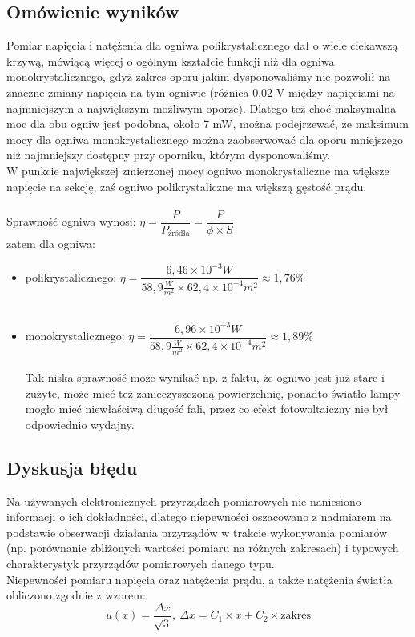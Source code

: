\documentclass[12pt,a4paper]{article}
\begin{document}
\newpage

\subsection{Omówienie wyników}
Pomiar napięcia i natężenia dla ogniwa polikrystalicznego dał o wiele ciekawszą krzywą, mówiącą więcej o ogólnym kształcie funkcji niż dla ogniwa monokrystalicznego, gdyż zakres oporu jakim dysponowaliśmy nie pozwolił na znaczne zmiany napięcia na tym ogniwie (różnica 0,02 V między napięciami na najmniejszym a największym możliwym oporze). Dlatego też choć maksymalna moc dla obu ogniw jest podobna, około 7 mW, można podejrzewać, że maksimum mocy dla ogniwa monokrystalicznego można zaobserwować dla oporu mniejszego niż najmniejszy dostępny przy oporniku, którym dysponowaliśmy. \\
W punkcie największej zmierzonej mocy ogniwo monokrystaliczne ma większe napięcie na sekcję, zaś ogniwo polikrystaliczne ma większą gęstość prądu.\\\\
Sprawność ogniwa wynosi:
$\eta = \dfrac{P}{P_{\text{źródła}}} = \dfrac{P}{\phi \times S}$ \\
zatem dla ogniwa:\\
\begin{itemize}
\item polikrystalicznego:
$\eta = \dfrac{6,46 \times 10^{-3} W}{58,9 \frac{W}{m^2} \times 62,4 \times 10^{-4} m^2} \approx 1,76 \%$ \\\\
\item monokrystalicznego:
$\eta = \dfrac{6,96 \times 10^{-3} W}{58,9 \frac{W}{m^2} \times 62,4 \times 10^{-4} m^2} \approx 1,89\% $  \\\\
Tak niska sprawność może wynikać np. z faktu, że ogniwo jest już stare i zużyte, może mieć też zanieczyszczoną powierzchnię, ponadto światło lampy mogło mieć niewłaściwą długość fali, przez co efekt fotowoltaiczny nie był odpowiednio wydajny.%
\end{itemize}

\subsection{Dyskusja błędu}
Na używanych elektronicznych przyrządach pomiarowych nie naniesiono informacji o ich dokładności, dlatego niepewności oszacowano z nadmiarem na podstawie obserwacji działania przyrządów w trakcie wykonywania pomiarów (np. porównanie zbliżonych wartości pomiaru na różnych zakresach) i typowych charakterystyk przyrządów pomiarowych danego typu.\\
Niepewności pomiaru napięcia oraz natężenia prądu, a także natężenia światła obliczono zgodnie z wzorem:
$$u(x) = \frac{\Delta x}{\sqrt{3}},\ \Delta x = C_1 \times x + C_2 \times \text{zakres}$$
\end{document}
